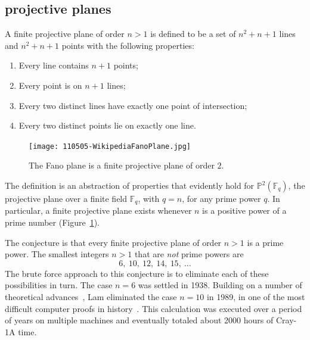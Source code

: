\documentclass{llncs}
\newcommand{\ring}[1]{\mathbb{#1}}
\begin{document}



\subsection{projective planes}

A finite projective plane of order $n>1$ is defined to be a set of
$n^2 + n + 1$ lines and $n^2 + n+ 1$ points with the following
properties:
\begin{enumerate}
\item Every line contains $n+1$ points;
\item Every point is on $n+1$ lines;
\item Every two distinct lines have exactly one point of intersection;
\item Every two distinct points lie on exactly one line.
\end{enumerate}

\begin{figure}[h!]
  \centering
\texttt{[image: 110505-WikipediaFanoPlane.jpg]}
  \caption{The Fano plane is a finite projective plane of order $2$.}
\label{fig:P2}
\end{figure}

The definition is an abstraction of properties that evidently
hold for $\ring{P}^2(\ring{F}_q)$, the projective plane over a finite
field $\ring{F}_q$, with $q=n$, for any prime power $q$.  In
particular, a finite projective plane exists whenever $n$ is a positive power of a prime
number (Figure~\ref{fig:P2}).

The conjecture is that every finite projective plane
of order $n>1$ is a prime power.  The smallest integers $n>1$
that are {\it not} prime powers are
\[
6,~10,~12,~14,~15,~\dots
\]
The brute force approach to this conjecture is to eliminate each of
these possibilities in turn.  The case $n=6$ was settled in 1938.
Building on a number of theoretical advances~\cite{MST}, Lam eliminated the case
$n=10$ in 1989, in one of the most difficult computer proofs in
history~\cite{Lam89}.  This calculation was executed over
a period of years on multiple machines and eventually totaled about 2000
hours of Cray-1A time.  
\end{document}

